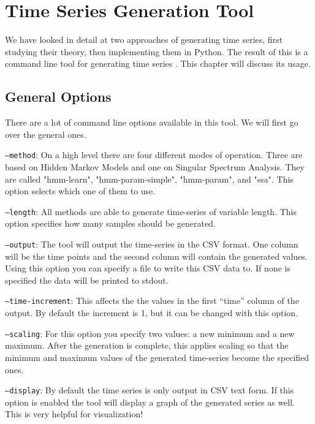 \chapter{Time Series Generation Tool}\label{chapter:tool}

We have looked in detail at two approaches of generating time series, first studying their theory, then implementing them in Python. The result of this is a command line tool for generating time series \parencite{tsgenerator}. This chapter will discuss its usage. 

\section{General Options}

There are a lot of command line options available in this tool. We will first go over the general ones. 

\texttt{---method}: On a high level there are four different modes of operation. Three are based on Hidden Markov Models and one on Singular Spectrum Analysis. They are called "hmm-learn", "hmm-param-simple", "hmm-param", and "ssa". This option selects which one of them to use. 

\texttt{---length}: All methods are able to generate time-series of variable length. This option specifies how many samples should be generated. 

\texttt{---output}: The tool will output the time-series in the CSV format. One column will be the time points and the second column will contain the generated values. Using this option you can specify a file to write this CSV data to. If none is specified the data will be printed to stdout. 

\texttt{---time-increment}: This affects the the values in the first ``time'' column of the output. By default the increment is 1, but it can be changed with this option. 

\texttt{---scaling}: For this option you specify two values: a new minimum and a new maximum. After the generation is complete, this applies scaling so that the minimum and maximum values of the generated time-series become the specified ones. 

\texttt{---display}: By default the time series is only output in CSV text form. If this option is enabled the tool will display a graph of the generated series as well. This is very helpful for visualization!

